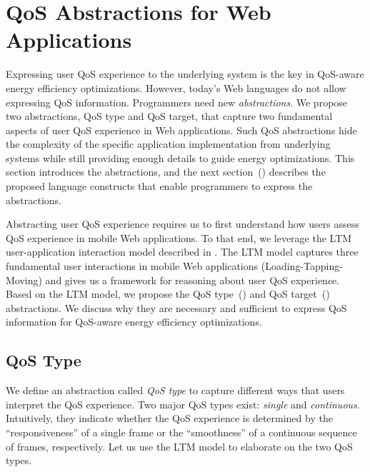 \section{QoS Abstractions for Web Applications}
\label{sec:lang:abst}

Expressing user QoS experience to the underlying system is the key in QoS-aware energy efficiency optimizations. However, today's Web languages do not allow expressing QoS information. Programmers need new \textit{abstractions}. We propose two abstractions, QoS type and QoS target, that capture two fundamental aspects of user QoS experience in Web applications. Such QoS abstractions hide the complexity of the specific application implementation from underlying systems while still providing enough details to guide energy optimizations. This section introduces the abstractions, and the next section~() describes the proposed language constructs that enable programmers to express the abstractions.

Abstracting user QoS experience requires us to first understand how users assess QoS experience in mobile Web applications. To that end, we leverage the LTM user-application interaction model described in . The LTM model captures three fundamental user interactions in mobile Web applications (Loading-Tapping-Moving) and gives us a framework for reasoning about user QoS experience. Based on the LTM model, we propose the QoS type~() and QoS target~() abstractions. We discuss why they are necessary and sufficient to express QoS information for QoS-aware energy efficiency optimizations.

\subsection{QoS Type}
\label{sec:lang:abst:type}

We define an abstraction called \textit{QoS type} to capture different ways that users interpret the QoS experience. Two major QoS types exist: \textit{single} and \textit{continuous}. Intuitively, they indicate whether the QoS experience is determined by the ``responsiveness'' of a single frame or the ``smoothness'' of a continuous sequence of frames, respectively. Let us use the LTM model to elaborate on the two QoS types.




